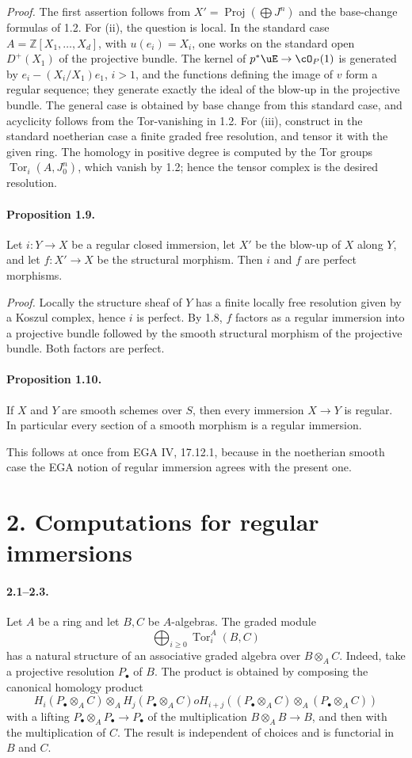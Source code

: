 \documentclass[11pt]{article}
\theoremstyle{plain}
\theoremstyle{definition}
\theoremstyle{remark}
\newcommand{\ZZ}{\mathbb Z}
\DeclareMathOperator{\Proj}{Proj}
\DeclareMathOperator{\Tor}{Tor}
\begin{document}
\emph{Proof.} The first assertion follows from $X'=\Proj(\bigoplus J^n)$ and the base-change formulas of 1.2. For (ii), the question is local. In the standard case $A=\ZZ[X_1,\ldots,X_d]$, with $u(e_i)=X_i$, one works on the standard open $D^+(X_1)$ of the projective bundle. The kernel of $p^*\uE\to\cO_P(1)$ is generated by $e_i-(X_i/X_1)e_1$, $i>1$, and the functions defining the image of $v$ form a regular sequence; they generate exactly the ideal of the blow-up in the projective bundle. The general case is obtained by base change from this standard case, and acyclicity follows from the Tor-vanishing in 1.2. For (iii), construct in the standard noetherian case a finite graded free resolution, and tensor it with the given ring. The homology in positive degree is computed by the Tor groups $\Tor_i(A,J_0^n)$, which vanish by 1.2; hence the tensor complex is the desired resolution.

\paragraph{Proposition 1.9.} Let $i:Y\to X$ be a regular closed immersion, let $X'$ be the blow-up of $X$ along $Y$, and let $f:X'\to X$ be the structural morphism. Then $i$ and $f$ are perfect morphisms.

\emph{Proof.} Locally the structure sheaf of $Y$ has a finite locally free resolution given by a Koszul complex, hence $i$ is perfect. By 1.8, $f$ factors as a regular immersion into a projective bundle followed by the smooth structural morphism of the projective bundle. Both factors are perfect.

\paragraph{Proposition 1.10.} If $X$ and $Y$ are smooth schemes over $S$, then every immersion $X\to Y$ is regular. In particular every section of a smooth morphism is a regular immersion.

This follows at once from EGA IV, 17.12.1, because in the noetherian smooth case the EGA notion of regular immersion agrees with the present one.

\section*{2. Computations for regular immersions}

\paragraph{2.1--2.3.} Let $A$ be a ring and let $B,C$ be $A$-algebras. The graded module
\[
\bigoplus_{i\geq0}\Tor_i^A(B,C)
\]
has a natural structure of an associative graded algebra over $B\otimes_A C$. Indeed, take a projective resolution $P_\bullet$ of $B$. The product is obtained by composing the canonical homology product
\[
H_i(P_\bullet\otimes_A C)\otimes_AH_j(P_\bullet\otimes_A C)	o H_{i+j}((P_\bullet\otimes_A C)\otimes_A(P_\bullet\otimes_A C))
\]
with a lifting $P_\bullet\otimes_A P_\bullet\to P_\bullet$ of the multiplication $B\otimes_AB\to B$, and then with the multiplication of $C$. The result is independent of choices and is functorial in $B$ and $C$.
\end{document}
